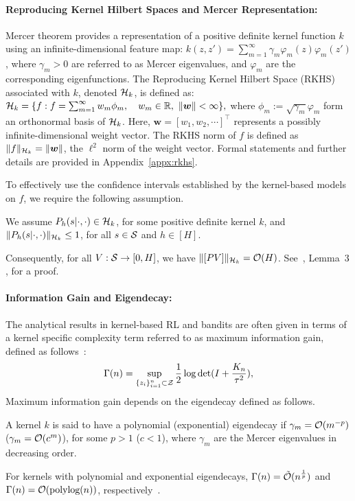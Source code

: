 \paragraph{Reproducing Kernel Hilbert Spaces and Mercer Representation:} Mercer theorem provides a representation of a positive definite kernel function $k$ using an infinite-dimensional feature map: $k(z,z')=\sum_{m=1}^{\infty}\gamma_m\varphi_m(z)\varphi_m(z')$,
where $\gamma_m > 0$ are referred to as Mercer eigenvalues, and $\varphi_m$ are the corresponding eigenfunctions. The Reproducing Kernel Hilbert Space (RKHS) associated with $k$, denoted $\mathcal{H}_k$, is defined as:
$
    \mathcal{H}_k =\{f: f =\sum_{m=1}^{\infty}w_m\phi_m,~~~ w_m\in\mathbb{R},~ \|\bm{w}\|<\infty\},
$
where $\phi_m := \sqrt{\gamma_m} \varphi_m$ form an orthonormal basis of $\mathcal{H}_k$. Here, $\bm{w} = [w_1, w_2, \cdots]^{\top}$ represents a possibly infinite-dimensional weight vector. The RKHS norm of $f$ is defined as $\|f\|_{\mathcal{H}_k}=\|\bm{w}\|$, the $\ell^2$ norm of the weight vector. Formal statements and further details are provided in Appendix~\ref{appx:rkhs}.

To effectively use the confidence intervals established by the kernel-based models on $f$,
we require the following assumption.
\begin{assumption}\label{ass:rkhsnorm}
    We assume $P_h(s|\cdot, \cdot)\in \mathcal{H}_k$, for some positive definite kernel $k$, and $\|P_h(s|\cdot, \cdot)\|_{\mathcal{H}_k}\le 1$, for all $s\in \mathcal{S}$ and $h\in[H]$. 
\end{assumption}

Consequently, for all $V:\mathcal{S}\rightarrow [0,H]$, we have $\|[PV]\|_{\mathcal{H}_k}=\mathcal{O}(H)$. See~\cite{yeh2023sample}, Lemma~$3$,
for a proof.




\paragraph{Information Gain and Eigendecay:}
The analytical results in kernel-based RL and bandits are often given in terms of a kernel specific complexity term referred to as maximum information gain, defined as follows~\citep{srinivas2009gaussian, vakili2021information}:
%
\begin{equation}
    \Gamma(n)=\sup_{\{z_i\}_{i=1}^{n}\subset \mathcal{Z}}\frac{1}{2}\log\det(I+\frac{K_n}{\tau^2}),
\end{equation}
%
Maximum information gain depends on the eigendecay defined as follows. 
\begin{definition}\label{def:eigendecay}
    A kernel $k$ is said to have a polynomial (exponential) eigendecay if $\gamma_m=\mathcal{O}(m^{-p})$ ($\gamma_m=\mathcal{O}(c^{m})$), for some $p>1$ ($c<1$), where $\gamma_m$ are the Mercer eigenvalues in decreasing order. 
\end{definition}
For kernels with polynomial and exponential eigendecays, $\Gamma(n) = \tilde{\mathcal{O}}(n^{\frac{1}{p}})$ and $\Gamma(n) = \mathcal{O}(\text{polylog}(n))$, respectively~\citep{vakili2021information}.

